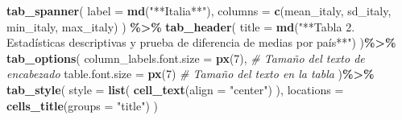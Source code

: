 \documentclass[
]{article}
\newenvironment{Shaded}{\begin{snugshade}}{\end{snugshade}}
\newcommand{\AttributeTok}[1]{\textcolor[rgb]{0.13,0.29,0.53}{#1}}
\newcommand{\CommentTok}[1]{\textcolor[rgb]{0.56,0.35,0.01}{\textit{#1}}}
\newcommand{\DecValTok}[1]{\textcolor[rgb]{0.00,0.00,0.81}{#1}}
\newcommand{\FunctionTok}[1]{\textcolor[rgb]{0.13,0.29,0.53}{\textbf{#1}}}
\newcommand{\NormalTok}[1]{#1}
\newcommand{\SpecialCharTok}[1]{\textcolor[rgb]{0.81,0.36,0.00}{\textbf{#1}}}
\newcommand{\StringTok}[1]{\textcolor[rgb]{0.31,0.60,0.02}{#1}}
\begin{document}
\begin{Shaded}
\begin{Highlighting}[]
  \FunctionTok{tab\_spanner}\NormalTok{(}
    \AttributeTok{label =} \FunctionTok{md}\NormalTok{(}\StringTok{"**Italia**"}\NormalTok{),}
    \AttributeTok{columns =} \FunctionTok{c}\NormalTok{(mean\_italy, sd\_italy, min\_italy, max\_italy)}
\NormalTok{  ) }\SpecialCharTok{\%\textgreater{}\%}
  \FunctionTok{tab\_header}\NormalTok{(}
    \AttributeTok{title =} \FunctionTok{md}\NormalTok{(}\StringTok{"**Tabla 2. Estadísticas descriptivas y prueba de }
\StringTok{               diferencia de medias por país**"}\NormalTok{)}
\NormalTok{  )}\SpecialCharTok{\%\textgreater{}\%}
  \FunctionTok{tab\_options}\NormalTok{(}
    \AttributeTok{column\_labels.font.size =} \FunctionTok{px}\NormalTok{(}\DecValTok{7}\NormalTok{), }\CommentTok{\# Tamaño del texto de encabezado}
    \AttributeTok{table.font.size =} \FunctionTok{px}\NormalTok{(}\DecValTok{7}\NormalTok{) }\CommentTok{\# Tamaño del texto en la tabla}
\NormalTok{  )}\SpecialCharTok{\%\textgreater{}\%}
  \FunctionTok{tab\_style}\NormalTok{(}
    \AttributeTok{style =} \FunctionTok{list}\NormalTok{(}
      \FunctionTok{cell\_text}\NormalTok{(}\AttributeTok{align =} \StringTok{"center"}\NormalTok{)  }
\NormalTok{    ),}
    \AttributeTok{locations =} \FunctionTok{cells\_title}\NormalTok{(}\AttributeTok{groups =} \StringTok{"title"}\NormalTok{) }
\NormalTok{  )}
\end{Highlighting}
\end{Shaded}
\end{document}
